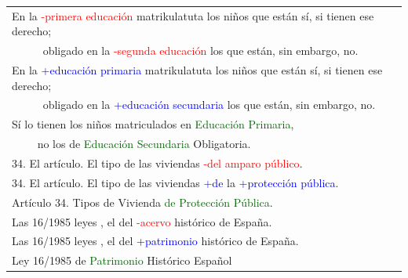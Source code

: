 \documentclass[25pt, a0paper, portrait, margin=0mm, innermargin=15mm,blockverticalspace=15mm, colspace=15mm, subcolspace=8mm]{tikzposter}
\begin{document}
\begin{columns}
{\begin{center}
\begin{tabular}{|l|}
En la \textcolor{red}{-primera educación} matrikulatuta los niños que están sí, si tienen ese derecho; \\ 
~~~~~ obligado en la \textcolor{red}{-segunda educación} los que están, sin embargo, no.  \\  %
En la \textcolor{blue}{+educación primaria} matrikulatuta los niños que están sí, si tienen ese derecho; \\ 
~~~~~ obligado en la \textcolor{blue}{+educación secundaria} los que están, sin embargo, no. \\  %
Sí lo tienen los niños matriculados en \textcolor{darkgreen}{Educación Primaria}, \\
~~~~ no los de \textcolor{darkgreen}{Educación Secundaria} Obligatoria.\\
\hline

34. El artículo. El tipo de las viviendas \textcolor{red}{-del amparo público}. \\ %
34. El artículo. El tipo de las viviendas \textcolor{blue}{+de} la \textcolor{blue}{+protección pública}. \\ %
Artículo 34. Tipos de Vivienda \textcolor{darkgreen}{de Protección Pública}.\\
\hline
Las 16/1985 leyes , el del \textcolor{red}{-acervo} histórico de España. \\ %
Las 16/1985 leyes , el del \textcolor{blue}{+patrimonio} histórico de España.  \\ %
Ley 16/1985 de \textcolor{darkgreen}{Patrimonio} Histórico Español \\
\hline
\end{tabular}
\end{center}



}


\end{columns}
\end{document}
